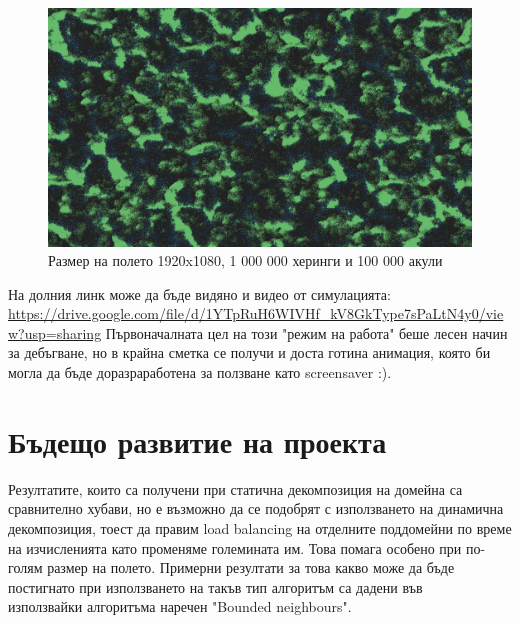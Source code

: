 \documentclass[12pt]{article}
\begin{document}
\begin{figure}[H]
	\centering
	\includegraphics[width=1\textwidth]{screenshot-big.png}
	\caption{Размер на полето 1920x1080, 1 000 000 херинги и 100 000 акули}
\end{figure}

На долния линк може да бъде видяно и видео от симулацията:\\
\url{https://drive.google.com/file/d/1YTpRuH6WIVHf_kV8GkType7sPaLtN4y0/view?usp=sharing}
\bigbreak
Първоначалната цел на този "режим на работа" беше лесен начин за дебъгване,
но в крайна сметка се получи и доста готина анимация, която би могла да бъде доразраработена за ползване като screensaver :).

\section{Бъдещо развитие на проекта}
Резултатите, които са получени при статична декомпозиция на домейна са сравнително хубави,
но е възможно да се подобрят с използването на динамична декомпозиция, тоест да правим
load balancing на отделните поддомейни по време на изчисленията като променяме големината им. Това помага особено при
по-голям размер на полето. Примерни резултати за това какво може да бъде постигнато при
използването на такъв тип алгоритъм са дадени във ~\cite{bounded_neighbours} използвайки алгоритъма наречен "Bounded neighbours".
{}

\end{document}
